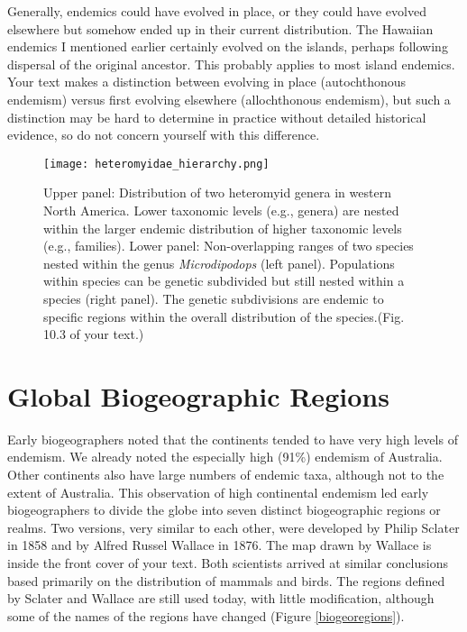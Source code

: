 \documentclass[11pt, oneside]{article}   	%
\begin{document}
Generally, endemics could have evolved in place, or they could have evolved elsewhere but somehow ended up in their current distribution.  The Hawaiian endemics I mentioned earlier certainly evolved on the islands, perhaps following dispersal of the original ancestor.  This probably applies to most island endemics.  Your text makes a distinction between evolving in place (autochthonous endemism) versus first evolving elsewhere (allochthonous endemism), but such a distinction may be hard to determine in practice without detailed historical evidence, so do not concern yourself with this difference.

\begin{figure}[tbp]
	\centering
		\texttt{[image: heteromyidae\_hierarchy.png]}
		\caption{Upper panel: Distribution of two heteromyid genera in western North America. Lower taxonomic levels (e.g., genera) are nested within the larger endemic distribution of higher taxonomic levels (e.g., families). Lower panel: Non-overlapping ranges of two species nested within the genus \emph{Microdipodops} (left panel). Populations within species can be genetic subdivided but still nested within a species (right panel). The genetic subdivisions are endemic to specific regions within the overall distribution of the species.(Fig. 10.3 of your text.)\label{heteroEndemism}}
		
\end{figure}


\section{Global Biogeographic Regions}

Early biogeographers noted that the continents tended to have very high levels of endemism.  We already noted the especially high (91\%) endemism of Australia.  Other continents also have large numbers of endemic taxa, although not to the extent of Australia.  This observation of high continental endemism led early biogeographers to divide the globe into seven distinct biogeographic regions or realms.  Two versions, very similar to each other, were developed by Philip Sclater in 1858 and by Alfred Russel Wallace in 1876. The map drawn by Wallace is inside the front cover of your text. Both scientists arrived at similar conclusions based primarily on the distribution of mammals and birds. The regions defined by Sclater and Wallace are still used today, with little modification, although some of the names of the regions have changed (Figure \ref{biogeoregions}).  
\end{document}
